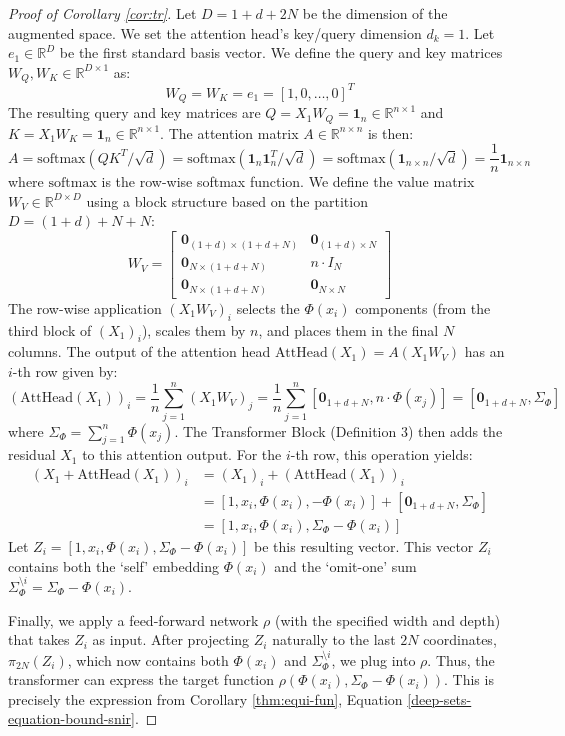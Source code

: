\documentclass[twoside,11pt]{article}
\newcommand{\RR}{\mathbb{R}}
\begin{document}
\begin{proof}[Proof of Corollary \ref{cor:tr}]
Let $D = 1+d+2N$ be the dimension of the augmented space. We set the attention head's key/query dimension $d_k = 1$. Let $e_1 \in \RR^D$ be the first standard basis vector. We define the query and key matrices $W_Q, W_K \in \RR^{D \times 1}$ as:
$$ W_Q = W_K = e_1 = [1, 0, \dots, 0]^T $$
The resulting query and key matrices are $Q = X_1 W_Q = \bm{1}_n \in \RR^{n \times 1}$ and $K = X_1 W_K = \bm{1}_n \in \RR^{n \times 1}$. The attention matrix $A \in \RR^{n \times n}$ is then:
$$ A = \mathrm{softmax}( Q K^T / \sqrt{d} ) = \mathrm{softmax}( \bm{1}_n \bm{1}_n^T / \sqrt{d} ) = \mathrm{softmax}( \bm{1}_{n \times n} / \sqrt{d} ) = \frac{1}{n} \bm{1}_{n \times n} $$
where $\mathrm{softmax}$ is the row-wise softmax function.
We define the value matrix $W_V \in \RR^{D \times D}$ using a block structure based on the partition $D = (1+d) + N + N$:
$$ W_V = \begin{bmatrix}
\mathbf{0}_{(1+d) \times (1+d+N)} & \mathbf{0}_{(1+d) \times N} \\
\mathbf{0}_{N \times (1+d+N)} & n \cdot I_N \\
\mathbf{0}_{N \times (1+d+N)} & \mathbf{0}_{N \times N}
\end{bmatrix} $$
The row-wise application $(X_1 W_V)_i$ selects the $\Phi(x_i)$ components (from the third block of $(X_1)_i$), scales them by $n$, and places them in the final $N$ columns.
The output of the attention head $\text{AttHead}(X_1) = A (X_1 W_V)$ has an $i$-th row given by:
$$ (\text{AttHead}(X_1))_i = \frac{1}{n} \sum_{j=1}^n (X_1 W_V)_j = \frac{1}{n} \sum_{j=1}^n [\mathbf{0}_{1+d+N}, n \cdot \Phi(x_j)] = [\mathbf{0}_{1+d+N}, \Sigma_{\Phi}] $$
where $\Sigma_{\Phi} = \sum_{j=1}^n \Phi(x_j)$.
The Transformer Block (Definition 3) then adds the residual $X_1$ to this attention output. For the $i$-th row, this operation yields:
\begin{align*}
    (X_1 + \text{AttHead}(X_1))_i &= (X_1)_i + (\text{AttHead}(X_1))_i \\
    &= [1, x_i, \Phi(x_i), -\Phi(x_i)] + [\mathbf{0}_{1+d+N}, \Sigma_{\Phi}] \\
    &= [1, x_i, \Phi(x_i), \Sigma_{\Phi}- \Phi(x_i)]
\end{align*}
Let $Z_i = [1, x_i, \Phi(x_i), \Sigma_{\Phi} - \Phi(x_i)]$ be this resulting vector. This vector $Z_i$ contains both the `self' embedding $\Phi(x_i)$ and the `omit-one' sum $\Sigma_{\Phi}^{\setminus i} = \Sigma_{\Phi} - \Phi(x_i)$.

Finally, we apply a feed-forward network $\rho$ (with the specified width and depth) that takes $Z_i$ as input. After projecting $Z_i$ naturally to the last $2N$ coordinates, $\pi_{2N}(Z_i)$, which  now contains both $\Phi(x_i)$ and $\Sigma_{\Phi}^{\setminus i}$, we plug into $\rho$. Thus, the transformer can express the target function $\rho(\Phi(x_i), \Sigma_{\Phi} - \Phi(x_i))$. This is precisely the expression from Corollary \ref{thm:equi-fun}, Equation \eqref{deep-sets-equation-bound-snir}.

\end{proof}
\end{document}
